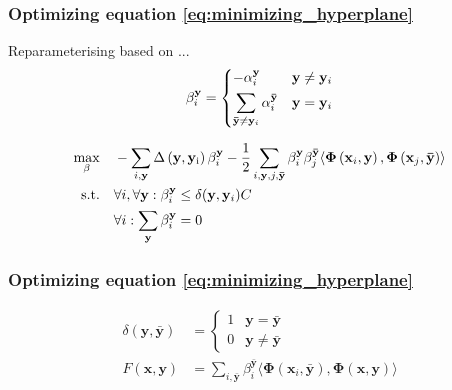 \begin{frame}
    \frametitle{Optimizing equation \eqref{eq:minimizing_hyperplane}}
    Reparameterising based on ...
    \begin{equation}
        \beta_i^\mathbf{y} = \begin{dcases}
                                -\alpha_i^\mathbf{y} & \mathbf{y} \ne \mathbf{y}_i \\
                                \sum_{\mathbf{\bar{y}} \ne \mathbf{y}_i} \alpha_i^\mathbf{\bar{y}} & \mathbf{y} = \mathbf{y}_i
                             \end{dcases}
    \end{equation}

    \begin{equation} \label{eq:maximizig_beta}
        \begin{aligned}
            \max_{\beta} \quad & -\sum_{i,\mathbf{y}} \operatorname{\Delta \left( \mathbf{y}, \mathbf{y}_i \right)} \beta_i^\mathbf{y} -
                \frac{1}{2} \sum_{i,\mathbf{y},j,\mathbf{\bar{y}}} \beta_i^\mathbf{y}
                \beta_j^\mathbf{\bar{y}} \langle \mathbf{\Phi}\left( \mathbf{x}_i, \mathbf{y}
                \right), \mathbf{\Phi}\left( \mathbf{x}_j, \mathbf{\bar{y}} \right) \rangle \\
            \operatorname{\text{s.t.} \quad} & \forall i, \forall \mathbf{y} : \beta_i^\mathbf{y} \le \delta(\mathbf{y}, \mathbf{y}_i) C \\
                & \forall i: \sum_\mathbf{y} \beta_i^\mathbf{y} = 0
        \end{aligned}
    \end{equation}
\end{frame}

\begin{frame}
    \frametitle{Optimizing equation \eqref{eq:minimizing_hyperplane}}
    \[
        \begin{aligned}
            \delta(\mathbf{y}, \mathbf{\bar{y}}) &= \begin{cases}
                                                    1 & \mathbf{y} = \mathbf{\bar{y}} \\
                                                    0 & \mathbf{y} \ne \mathbf{\bar{y}}
                                               \end{cases} \nonumber \\
            F\left(\mathbf{x}, \mathbf{y}\right) & = \sum_{i, \mathbf{\bar{y}}} \beta_i^\mathbf{\bar{y}}
                \langle \mathbf{\Phi}\left(\mathbf{x}_i, \mathbf{\bar{y}}\right),
                \mathbf{\Phi}\left(\mathbf{x}, \mathbf{y}\right) \rangle
        \end{aligned}
    \]
\end{frame}

